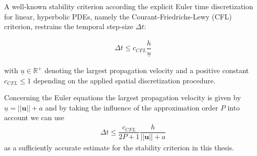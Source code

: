 	A well-known stability criterion according the explicit Euler time discretization for linear, hyperbolic PDEs, namely the Courant-Friedrichs-Lewy (CFL) criterion, restrains the temporal step-size $\Delta t$:
	
	\begin{align}
		\Delta t \leq c_{CFL} \dfrac{h}{\underline{u}}
	\end{align}
	
	with $\underline{u} \in \mathbb{R}^+$ denoting the largest propagation velocity and a positive constant $c_{CFL} \leq 1$ depending on the applied spatial discretization procedure.
	
	Concerning the Euler equations the largest propagation velocity is given by $\underline{u} = ||\mathbf{u} || + a$ and by taking the influence of the approximation order $P$ into account we can use 
	\begin{align}
		\Delta t \leq \dfrac{c_{CFL}}{2P+1} \dfrac{h}{||\mathbf{u} || + a}
	\end{align}
	as a sufficiently accurate estimate for the stability criterion in this thesis. 
